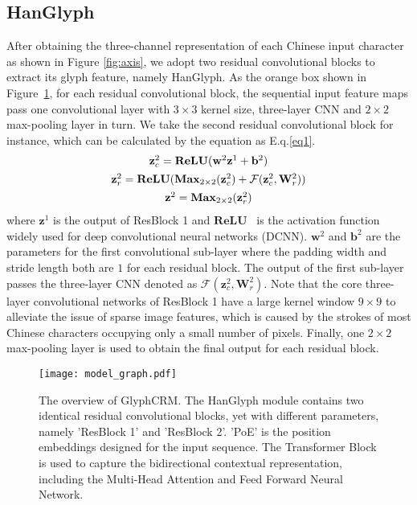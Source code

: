 \subsection{HanGlyph}
After obtaining the three-channel representation of each Chinese input character as shown in Figure \ref{fig:axis}, we adopt two residual convolutional blocks to extract its glyph feature, namely HanGlyph. As the orange box shown in Figure~\ref{fig:model}, for each residual convolutional block, the sequential input feature maps pass one convolutional layer with $3\times3$ kernel size, three-layer CNN and $2\times2$ max-pooling layer in turn. We take the second residual convolutional block for instance, which can be calculated by the equation as E.q.\ref{eq1}.
\begin{equation}
    \begin{array}{c}
    \mathbf{z}_{c}^{2} = \mathbf{ReLU}(\mathbf{w}^{2}\mathbf{z}^{1} + \mathbf{b}^{2})\vspace{1ex} \\
    \mathbf{z}_{r}^{2} = \mathbf{ReLU}( \mathbf{Max}_{2\times2}(\mathbf{z}_{c}^{2}) + \mathcal{F}(\mathbf{z}_{c}^{2}, \mathbf{W}_{r}^{2})) \vspace{1ex}\\
    \mathbf{z}^{2} = \mathbf{Max}_{2\times2}(\mathbf{z}_{r}^{2})
    
    \end{array}
    \label{eq1}
\end{equation} where $\mathbf{z}^{1}$ is the output of ResBlock 1 and $\mathbf{ReLU}$~\cite{relu} is the activation function widely used for deep convolutional neural networks (DCNN). $\mathbf{w}^{2}$ and $\mathbf{b}^{2}$ are the parameters for the first convolutional sub-layer where the padding width and stride length both are $1$ for each residual block. The output of the first sub-layer passes the 
three-layer CNN denoted as $\mathcal{F}(\mathbf{z}_{c}^{2}, \mathbf{W}_{r}^{2})$. 
Note that the core three-layer convolutional networks of ResBlock 1 have a large kernel window $9\times9$ to alleviate the issue of sparse image features, which is caused by the strokes of most Chinese characters occupying only a small number of pixels. Finally, one $2\times2$ max-pooling layer is used to obtain the final output for each residual block. 
\begin{figure}[t]
    \centering
    \texttt{[image: model\_graph.pdf]}
    \caption{The overview of GlyphCRM. The HanGlyph module contains two identical residual convolutional blocks, yet with different parameters, namely 'ResBlock 1' and 'ResBlock 2'. 'PoE' is the position embeddings designed for the input sequence. The Transformer Block is used to capture the bidirectional contextual representation, including the Multi-Head Attention and Feed Forward Neural Network.}
    \label{fig:model}
\end{figure}


